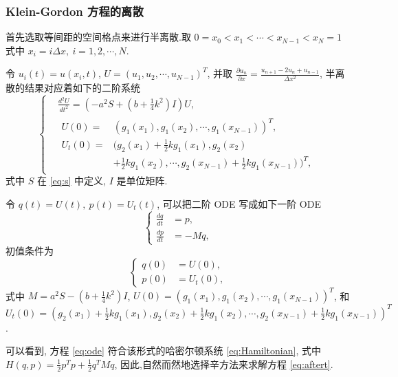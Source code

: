 \subsubsection{Klein-Gordon 方程的离散}
首先选取等间距的空间格点来进行半离散.取 $0=x_0<x_1<\cdots<x_{N-1}<x_N=1$ 式中 $x_i=i\Delta x,~i = 1,2,\cdots,N$.

令 $u_i(t)=u(x_i,t)$, $U=(u_1,u_2,\cdots,u_{N-1})^T$, 并取 $\frac{\partial u_n}{\partial
x}=\frac{u_{n+1}-2u_n+u_{n-1}}{\Delta x^2}$, 半离散的结果对应着如下的二阶系统
\begin{equation}\label{eq:aftert}
\left\lbrace
\begin{aligned}
&\frac{d^2U}{dt^2}=(-a^2 S+(b+\frac{1}{4}k^2)I) U,\\
&\begin{aligned}
U(0)=&(g_1(x_1),g_1(x_2),\cdots,g_1(x_{N-1}))^T,\\
U_t(0)=&(g_2(x_1)+\frac{1}{2}kg_1(x_1),g_2(x_2)\\
    &+\frac{1}{2}kg_1(x_2),\cdots,g_2(x_{N-1})+\frac{1}{2}kg_1(x_{N-1}))^T,
\end{aligned}
\end{aligned}
\right.
\end{equation}
式中
$S$ 在 \eqref{eq:s} 中定义, $I$ 是单位矩阵.

令 $q(t)=U(t),~ p(t)=U_t(t)$, 可以把二阶 ODE 写成如下一阶 ODE
\begin{equation}\label{eq:ode}
\left\lbrace
\begin{aligned}
\frac{dq}{dt}&=p,\\
\frac{dp}{dt}&=-Mq,
\end{aligned}
\right.
\end{equation}
初值条件为
\begin{equation*}
\left\lbrace
\begin{aligned}
q(0)&=U(0),\\
p(0)&=U_t(0),
\end{aligned}
\right.
\end{equation*}
式中 $M=a^2 S-(b+\frac{1}{4}k^2)I$,
$U(0)=(g_1(x_1),g_1(x_2),\cdots,g_1(x_{N-1}))^T$, 和
$U_t(0)=(g_2(x_1)+\frac{1}{2}kg_1(x_1),g_2(x_2)+\frac{1}{2}kg_1(x_2),\cdots,g_2(x_{N-1})+\frac{1}{2}kg_1(x_{N-1}))^T$.

可以看到, 方程 \eqref{eq:ode} 符合该形式的哈密尔顿系统 \eqref{eq:Hamiltonian}, 式中
$H(q,p)=\frac{1}{2}p^Tp+\frac{1}{2}q^TMq$, 因此,自然而然地选择辛方法来求解方程 \eqref{eq:aftert}.

